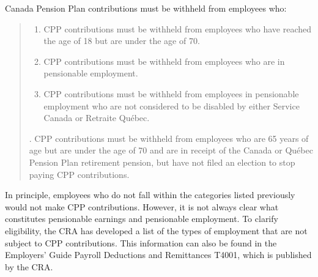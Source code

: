 \documentclass[letterpaper,10pt,english]{sphinxmanual}
\begin{document}
\sphinxAtStartPar
Canada Pension Plan contributions must be withheld from employees who:
\begin{quote}
\begin{enumerate}
%
\item {} 
\sphinxAtStartPar
CPP contributions must be withheld from employees who have reached the age of 18 but are under the age of 70.

\item {} 
\sphinxAtStartPar
CPP contributions must be withheld from employees who are in pensionable employment.

\item {} 
\sphinxAtStartPar
CPP contributions must be withheld from employees in pensionable employment who are not considered to be disabled by either Service Canada or Retraite Québec.

\end{enumerate}

. CPP contributions must be withheld from employees who are 65 years of age but are under the age of 70 and are in receipt of the Canada or Québec Pension Plan retirement
pension, but have not filed an election to stop paying CPP contributions.
\end{quote}

\sphinxAtStartPar
In principle, employees who do not fall within the categories listed previously would not make CPP contributions. However, it
is not always clear what constitutes pensionable earnings and pensionable employment. To clarify eligibility, the CRA has
developed a list of the types of employment that are not subject to CPP contributions. This information can also be found in
the Employers’ Guide \sphinxhyphen{} Payroll Deductions and Remittances \sphinxhyphen{} T4001, which is published by the CRA.
\end{document}

